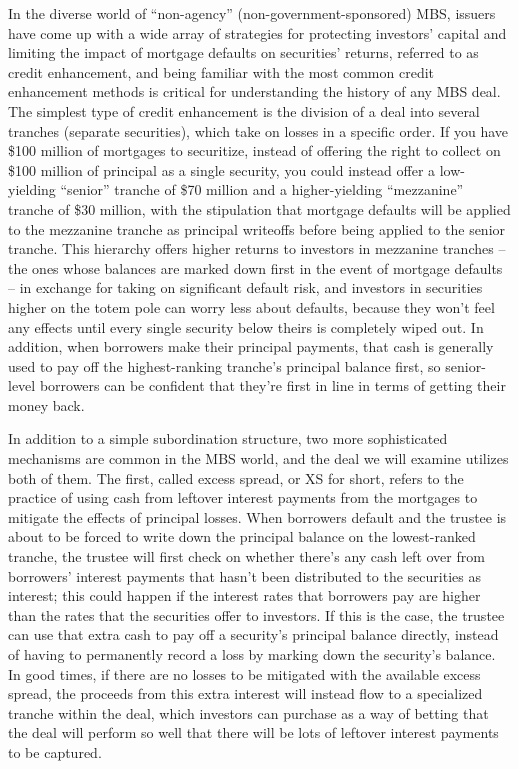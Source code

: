 \documentclass[12pt]{article}
\begin{document}
In the diverse world of “non-agency” (non-government-sponsored) MBS, issuers have come up with a wide array of strategies for protecting investors’ capital and limiting the impact of mortgage defaults on securities’ returns, referred to as credit enhancement, and being familiar with the most common credit enhancement methods is critical for understanding the history of any MBS deal. The simplest type of credit enhancement is the division of a deal into several tranches (separate securities), which take on losses in a specific order. If you have \$100 million of mortgages to securitize, instead of offering the right to collect on \$100 million of principal as a single security, you could instead offer a low-yielding “senior” tranche of \$70 million and a higher-yielding “mezzanine” tranche of \$30 million, with the stipulation that mortgage defaults will be applied to the mezzanine tranche as principal writeoffs before being applied to the senior tranche. This hierarchy offers higher returns to investors in mezzanine tranches – the ones whose balances are marked down first in the event of mortgage defaults – in exchange for taking on significant default risk, and investors in securities higher on the totem pole can worry less about defaults, because they won’t feel any effects until every single security below theirs is completely wiped out. In addition, when borrowers make their principal payments, that cash is generally used to pay off the highest-ranking tranche’s principal balance first, so senior-level borrowers can be confident that they’re first in line in terms of getting their money back.
	
In addition to a simple subordination structure, two more sophisticated mechanisms are common in the MBS world, and the deal we will examine utilizes both of them. The first, called excess spread, or XS for short, refers to the practice of using cash from leftover interest payments from the mortgages to mitigate the effects of principal losses. When borrowers default and the trustee is about to be forced to write down the principal balance on the lowest-ranked tranche, the trustee will first check on whether there’s any cash left over from borrowers’ interest payments that hasn’t been distributed to the securities as interest; this could happen if the interest rates that borrowers pay are higher than the rates that the securities offer to investors. If this is the case, the trustee can use that extra cash to pay off a security’s principal balance directly, instead of having to permanently record a loss by marking down the security’s balance. In good times, if there are no losses to be mitigated with the available excess spread, the proceeds from this extra interest will instead flow to a specialized tranche within the deal, which investors can purchase as a way of betting that the deal will perform so well that there will be lots of leftover interest payments to be captured.
	
\end{document}
